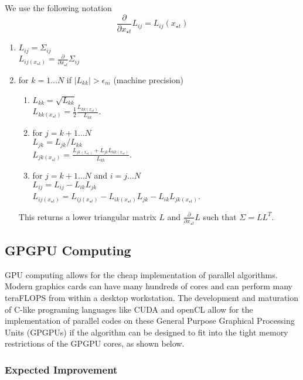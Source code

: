 \documentclass[index]{subfiles}
\begin{document}
We use the following notation
\begin{equation}
    \frac{\partial}{\partial x_{\star t}} L_{ij} = L_{ij} (x_{\star t})
\end{equation}
\begin{enumerate}
 \item $L_{ij} = \Sigma_{ij}$ \\
       $L_{ij (x_{\star t})} = \frac{\partial}{\partial x_{\star t}} \Sigma_{ij}$
 \item for $k = 1\ldots N$ if $|L_{kk}| > \epsilon_{m}$ (machine precision)
 \begin{enumerate}
  \item $L_{kk} = \sqrt{L_{kk}}$ \\
	$L_{kk (x_{\star t})} = \frac{1}{2} \frac{L_{kk (x_{\star t})}}{L_{kk}}$.
  \item for $j = k+1\ldots N$ \\
	$L_{jk} = L_{jk}/L_{kk}$ \\
	$L_{jk (x_{\star t})} = \frac{L_{jk (x_{\star t})} + L_{jk}L_{kk (x_{\star t})}}{L_{kk}}$.
  \item for $j = k+1\ldots N$ and $i = j\ldots N$ \\
	$L_{ij} = L_{ij} - L_{ik}L_{jk}$ \\
	$L_{ij (x_{\star t})} = L_{ij (x_{\star t})} - L_{ik (x_{\star t})}L_{jk} - L_{ik}L_{jk (x_{\star t})}$.
 \end{enumerate}

This returns a lower triangular matrix $L$ and $\frac{\partial}{\partial x_{\star t}} L$ such that $\Sigma = LL^{T}$.

\end{enumerate}

\subsection{GPGPU Computing} %
\label{sec:GPGPU Computing}

GPU computing allows for the cheap implementation of parallel algorithms. Modern graphics cards can have many hundreds of cores and can perform many teraFLOPS from within a desktop workstation. The development and maturation of C-like programing languages like CUDA and openCL allow for the implementation of parallel codes on these General Purpose Graphical Processing Units (GPGPUs) if the algorithm can be designed to fit into the tight memory restrictions of the GPGPU cores, as shown below.

\subsubsection{Expected Improvement}
\label{GPUEI}
\end{document}
